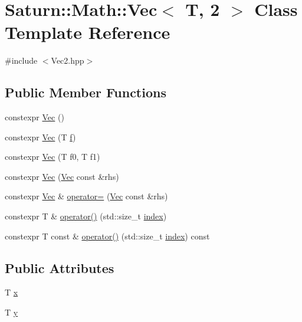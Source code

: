 \hypertarget{class_saturn_1_1_math_1_1_vec_3_01_t_00_012_01_4}{}\section{Saturn\+:\+:Math\+:\+:Vec$<$ T, 2 $>$ Class Template Reference}
\label{class_saturn_1_1_math_1_1_vec_3_01_t_00_012_01_4}


{\ttfamily \#include $<$Vec2.\+hpp$>$}

\subsection*{Public Member Functions}
\begin{DoxyCompactItemize}
\item 
constexpr \mbox{\hyperlink{class_saturn_1_1_math_1_1_vec_3_01_t_00_012_01_4_a4106453ff907cd5148e71d0ab0d82337}{Vec}} ()
\item 
constexpr \mbox{\hyperlink{class_saturn_1_1_math_1_1_vec_3_01_t_00_012_01_4_a28efe1b6694815ce1773f1981f228ebe}{Vec}} (T \mbox{\hyperlink{glad_8h_a6a8efad2e332fcd916bde9e19ddef215}{f}})
\item 
constexpr \mbox{\hyperlink{class_saturn_1_1_math_1_1_vec_3_01_t_00_012_01_4_a85995607beb50c26942e181386b19e1f}{Vec}} (T f0, T f1)
\item 
constexpr \mbox{\hyperlink{class_saturn_1_1_math_1_1_vec_3_01_t_00_012_01_4_ae5ad36ab0decbf62688635099c3db0a6}{Vec}} (\mbox{\hyperlink{class_saturn_1_1_math_1_1_vec}{Vec}} const \&rhs)
\item 
constexpr \mbox{\hyperlink{class_saturn_1_1_math_1_1_vec}{Vec}} \& \mbox{\hyperlink{class_saturn_1_1_math_1_1_vec_3_01_t_00_012_01_4_a6cf2f317277b862a0e78dc32bcce8460}{operator=}} (\mbox{\hyperlink{class_saturn_1_1_math_1_1_vec}{Vec}} const \&rhs)
\item 
constexpr T \& \mbox{\hyperlink{class_saturn_1_1_math_1_1_vec_3_01_t_00_012_01_4_a24c12b0fe7dac1cf1a690dbfa57f1e8c}{operator()}} (std\+::size\+\_\+t \mbox{\hyperlink{glad_8h_ab47dd9958bcadea08866b42bf358e95e}{index}})
\item 
constexpr T const  \& \mbox{\hyperlink{class_saturn_1_1_math_1_1_vec_3_01_t_00_012_01_4_a8d4335b73820fe0bd9510daab0ee8959}{operator()}} (std\+::size\+\_\+t \mbox{\hyperlink{glad_8h_ab47dd9958bcadea08866b42bf358e95e}{index}}) const
\end{DoxyCompactItemize}
\subsection*{Public Attributes}
\begin{DoxyCompactItemize}
\item 
T \mbox{\hyperlink{class_saturn_1_1_math_1_1_vec_3_01_t_00_012_01_4_a30599fbfc92a314cbe9db450f3c410eb}{x}}
\item 
T \mbox{\hyperlink{class_saturn_1_1_math_1_1_vec_3_01_t_00_012_01_4_a12e22267749916641c5f5d161bbc1ca8}{y}}
\end{DoxyCompactItemize}


